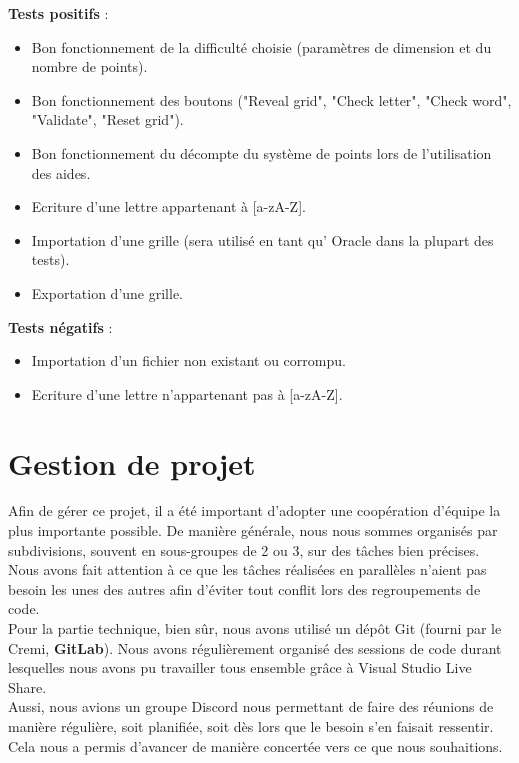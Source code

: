 \documentclass [ 11 pt ] {article}
\begin{document}
\textbf{Tests positifs} : 
\begin{itemize}
    \item Bon fonctionnement de la difficulté choisie (paramètres de dimension et du nombre de points).
    \item Bon fonctionnement des boutons ("Reveal grid", "Check letter", "Check word", "Validate", "Reset grid").
    \item Bon fonctionnement du décompte du système de points lors de l'utilisation des aides.
    \item Ecriture d'une lettre appartenant à [a-zA-Z].
    \item Importation d'une grille (sera utilisé en tant qu' Oracle dans la plupart des tests).
    \item Exportation d'une grille.
\end{itemize}

\textbf{Tests négatifs} : 
\begin{itemize}
    \item Importation d'un fichier non existant ou corrompu.
    \item Ecriture d'une lettre n'appartenant pas à [a-zA-Z].
\end{itemize}




\newpage
\section{Gestion de projet}

\hspace{0.6cm}Afin de gérer ce projet, il a été important d'adopter une coopération d'équipe la plus importante possible. De manière générale, nous nous sommes organisés par subdivisions, souvent en sous-groupes de 2 ou 3, sur des tâches bien précises. Nous avons fait attention à ce que les tâches réalisées en parallèles n'aient pas besoin les unes des autres afin d'éviter tout conflit lors des regroupements de code. \\

Pour la partie technique, bien sûr, nous avons utilisé un dépôt Git (fourni par le Cremi, \textbf{GitLab}). Nous avons régulièrement organisé des sessions de code durant lesquelles nous avons pu travailler tous ensemble grâce à Visual Studio Live Share. \\

Aussi, nous avions un groupe Discord nous permettant de faire des réunions de manière régulière, soit planifiée, soit dès lors que le besoin s'en faisait ressentir. Cela nous a permis d'avancer de manière concertée vers ce que nous souhaitions. \\
\end{document}
